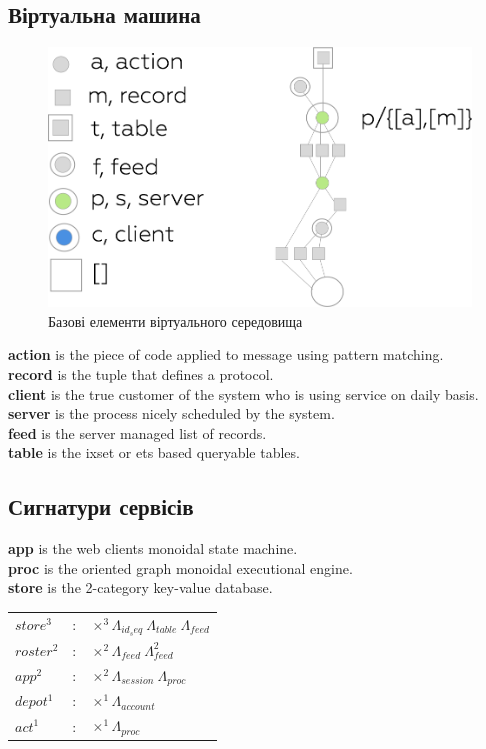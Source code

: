 \documentclass[11pt,oneside]{article}
\begin{document}
\newpage

\subsection*{Віртуальна машина}

\begin{figure}[h!]
\centering
\includegraphics[scale=0.3]{img/exe-legend}
\caption{Базові елементи віртуального середовища}
\end{figure}

{\bf action} is the piece of code applied to message using pattern matching.\\
{\bf record} is the tuple that defines a protocol.\\
{\bf client} is the true customer of the system who is using service on daily basis.\\
{\bf server} is the process nicely scheduled by the system.\\
{\bf feed} is the server managed list of records.\\
{\bf table} is the ixset or ets based queryable tables.\\

\subsection*{Сигнатури сервісів}

{\bf app} is the web clients monoidal state machine.\\
{\bf proc} is the oriented graph monoidal executional engine.\\
{\bf store} is the 2-category key-value database.\\

\begin{center}
\begin{tabular}{lll}
           $store^3$ &:& $\times^3 \Lambda_{id_seq}\ \Lambda_{table}\ \Lambda_{feed}$ \\
          $roster^2$ &:& $\times^2 \Lambda_{feed}\ \Lambda^2_{feed}$ \\
             $app^2$ &:& $\times^2 \Lambda_{session}\ \Lambda_{proc}$ \\
           $depot^1$ &:& $\times^1 \Lambda_{account}$ \\
             $act^1$ &:& $\times^1 \Lambda_{proc}$ \\
\end{tabular}
\end{center}
\end{document}
